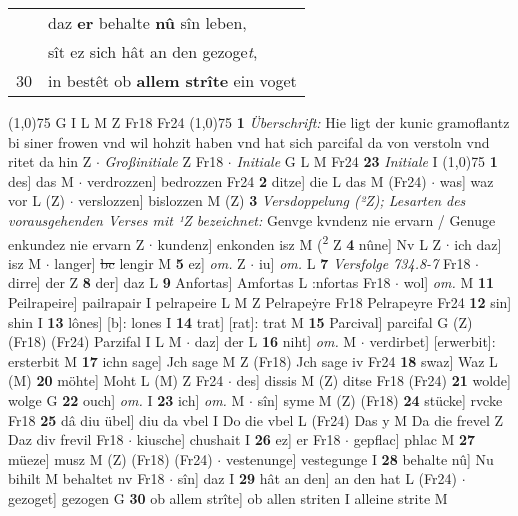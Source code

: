 \documentclass[8pt,a4paper,notitlepage]{article}
\begin{document}
\begin{table}[ht]
\begin{minipage}[t]{0.5\linewidth}
\begin{tabular}{rl}
 & daz \textbf{er} behalte \textbf{nû} sîn leben,\\ 
 & sît ez sich hât an den gezoge\textit{t},\\ 
30 & in bestêt ob \textbf{allem strîte} ein voget\\ 
\end{tabular}
\scriptsize
\line(1,0){75} \newline
G I L M Z Fr18 Fr24 \newline
\line(1,0){75} \newline
\textbf{1} \textit{Überschrift:} Hie ligt der kunic gramoflantz bi siner frowen vnd wil hohzit haben vnd hat sich parcifal da von verstoln vnd ritet da hin Z   $\cdot$ \textit{Großinitiale} Z Fr18   $\cdot$ \textit{Initiale} G L M Fr24  \textbf{23} \textit{Initiale} I  \newline
\line(1,0){75} \newline
\textbf{1} des] das M  $\cdot$ verdrozzen] bedrozzen Fr24 \textbf{2} ditze] die L das M (Fr24)  $\cdot$ was] waz vor L (Z)  $\cdot$ verslozzen] bislozzen M (Z) \textbf{3} \textit{Versdoppelung (²Z); Lesarten des vorausgehenden Verses mit ¹Z bezeichnet:} Genvge kvndenz nie ervarn / Genuge enkundez nie ervarn Z   $\cdot$ kundenz] enkonden isz M (\textsuperscript{2}\hspace{-1.3mm} Z \textbf{4} nûne] Nv L Z  $\cdot$ ich daz] isz M  $\cdot$ langer] \sout{bc} lengir M \textbf{5} ez] \textit{om.} Z  $\cdot$ iu] \textit{om.} L \textbf{7} \textit{Versfolge 734.8-7} Fr18   $\cdot$ dirre] der Z \textbf{8} der] daz L \textbf{9} Anfortas] Amfortas L :nfortas Fr18  $\cdot$ wol] \textit{om.} M \textbf{11} Peilrapeire] pailrapair I pelrapeire L M Z Pelrapeẏre Fr18 Pelrapeyre Fr24 \textbf{12} sin] shin I \textbf{13} lônes] [b]: lones I \textbf{14} trat] [rat]: trat M \textbf{15} Parcival] parcifal G (Z) (Fr18) (Fr24) Parzifal I L M  $\cdot$ daz] der L \textbf{16} niht] \textit{om.} M  $\cdot$ verdirbet] [erwerbit]: ersterbit M \textbf{17} ichn sage] Jch sage M Z (Fr18) Jch sage iv Fr24 \textbf{18} swaz] Waz L (M) \textbf{20} möhte] Moht L (M) Z Fr24  $\cdot$ des] dissis M (Z) ditse Fr18 (Fr24) \textbf{21} wolde] wolge G \textbf{22} ouch] \textit{om.} I \textbf{23} ich] \textit{om.} M  $\cdot$ sîn] syme M (Z) (Fr18) \textbf{24} stücke] rvcke Fr18 \textbf{25} dâ diu übel] diu da vbel I Do die vbel L (Fr24) Das y M Da die frevel Z Daz div frevil Fr18  $\cdot$ kiusche] chushait I \textbf{26} ez] er Fr18  $\cdot$ gepflac] phlac M \textbf{27} müeze] musz M (Z) (Fr18) (Fr24)  $\cdot$ vestenunge] vestegunge I \textbf{28} behalte nû] Nu bihilt M behaltet nv Fr18  $\cdot$ sîn] daz I \textbf{29} hât an den] an den hat L (Fr24)  $\cdot$ gezoget] gezogen G \textbf{30} ob allem strîte] ob allen striten I alleine strite M \newline

\end{minipage}
\end{table}
\end{document}
